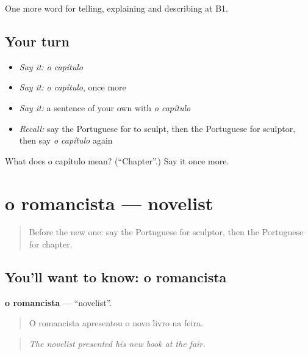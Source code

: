 \begin{grammarlens}[title={What you've built}]
One more word for telling, explaining and describing at B1.
\end{grammarlens}

\subsection*{Your turn}
\begin{itemize}
\raggedright
  \item \emph{Say it:} \emph{o capítulo}
  \item \emph{Say it:} \emph{o capítulo}, once more
  \item \emph{Say it:} a sentence of your own with \emph{o capítulo}
  \item \emph{Recall:} say the Portuguese for to sculpt, then the Portuguese for sculptor, then say \emph{o capítulo} again
\end{itemize}

\begin{tcolorbox}[breakable,colback=teal!4,colframe=teal!35!black,title={Before you move on}]
What does o capítulo mean? (\textquotedblleft{}Chapter\textquotedblright{}.) Say it once more.
\end{tcolorbox}
\section[o romancista]{o romancista — novelist}

\label{lesson:PT-C523-romancista}



\begin{quote}
Before the new one: say the Portuguese for sculptor, then the Portuguese for chapter.
\end{quote}

\subsection*{You'll want to know: o romancista}
\textbf{o romancista} — \textquotedblleft{}novelist\textquotedblright{}.

\begin{quote}
O romancista apresentou o novo livro na feira.
\end{quote}

\begin{quote}
\emph{The novelist presented his new book at the fair.}
\end{quote}

